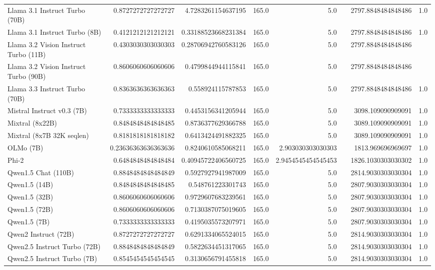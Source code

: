 \begin{table}[htp]
{\begin{tabular}{lrrrrrrr}
Llama 3.1 Instruct Turbo (70B) & 0.8727272727272727 & 4.7283261154637195 & 165.0 & 5.0 &  & 2797.8848484848486 & 1.0 \\
Llama 3.1 Instruct Turbo (8B) & 0.4121212121212121 & 0.33188523668231384 & 165.0 & 5.0 &  & 2797.8848484848486 & 1.0 \\
Llama 3.2 Vision Instruct Turbo (11B) & 0.4303030303030303 & 0.28706942760583126 & 165.0 & 5.0 &  & 2797.8848484848486 &  \\
Llama 3.2 Vision Instruct Turbo (90B) & 0.8606060606060606 & 0.4799844944115841 & 165.0 & 5.0 &  & 2797.8848484848486 &  \\
Llama 3.3 Instruct Turbo (70B) & 0.8363636363636363 & 0.558924115787853 & 165.0 & 5.0 &  & 2797.8848484848486 & 1.0 \\
Mistral Instruct v0.3 (7B) & 0.7333333333333333 & 0.4453156341205944 & 165.0 & 5.0 &  & 3098.109090909091 & 1.0 \\
Mixtral (8x22B) & 0.8484848484848485 & 0.8736377629366788 & 165.0 & 5.0 &  & 3089.109090909091 & 1.0 \\
Mixtral (8x7B 32K seqlen) & 0.8181818181818182 & 0.6413424491882325 & 165.0 & 5.0 &  & 3089.109090909091 & 1.0 \\
OLMo (7B) & 0.23636363636363636 & 0.8240610585068211 & 165.0 & 2.903030303030303 &  & 1813.969696969697 & 1.0 \\
Phi-2 & 0.6484848484848484 & 0.40945722406560725 & 165.0 & 2.9454545454545453 &  & 1826.1030303030302 & 1.0 \\
Qwen1.5 Chat (110B) & 0.8848484848484849 & 0.5927927941987009 & 165.0 & 5.0 &  & 2814.9030303030304 & 1.0 \\
Qwen1.5 (14B) & 0.8484848484848485 & 0.548761223301743 & 165.0 & 5.0 &  & 2807.9030303030304 & 1.0 \\
Qwen1.5 (32B) & 0.8606060606060606 & 0.9729607683239561 & 165.0 & 5.0 &  & 2807.9030303030304 & 1.0 \\
Qwen1.5 (72B) & 0.8606060606060606 & 0.7130387075019605 & 165.0 & 5.0 &  & 2807.9030303030304 & 1.0 \\
Qwen1.5 (7B) & 0.7333333333333333 & 0.4195035573207971 & 165.0 & 5.0 &  & 2807.9030303030304 & 1.0 \\
Qwen2 Instruct (72B) & 0.8727272727272727 & 0.6291334065524015 & 165.0 & 5.0 &  & 2814.9030303030304 & 1.0 \\
Qwen2.5 Instruct Turbo (72B) & 0.8848484848484849 & 0.5822634451317065 & 165.0 & 5.0 &  & 2814.9030303030304 & 1.0 \\
Qwen2.5 Instruct Turbo (7B) & 0.8545454545454545 & 0.3130656791455818 & 165.0 & 5.0 &  & 2814.9030303030304 & 1.0 \\

\end{tabular}}
\end{table}
